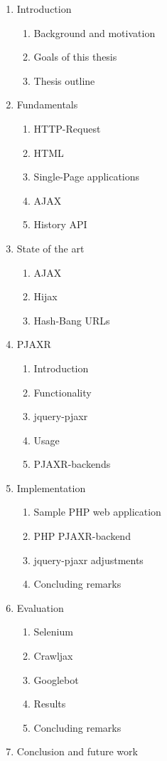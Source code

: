 \documentclass[f,bachelor,binding,twoside,palatino]{WeSTthesis}
\begin{document}
\begin{enumerate}
  \item Introduction
  \begin{enumerate}[label*=\arabic*.]
  	\item Background and motivation
  	\item Goals of this thesis
  	\item Thesis outline
  \end{enumerate}
  \item Fundamentals
  \begin{enumerate}[label*=\arabic*.]
  	\item HTTP-Request
  	\item HTML
  	\item Single-Page applications
  	\item AJAX
  	\item History API
  \end{enumerate}
  \item State of the art
  \begin{enumerate}[label*=\arabic*.]
  	\item AJAX
  	\item Hijax
  	\item Hash-Bang URLs
  \end{enumerate}
  \item PJAXR
  \begin{enumerate}[label*=\arabic*.]
  	\item Introduction
      \item Functionality
  	\item jquery-pjaxr
  	\item Usage
  	\item PJAXR-backends
  \end{enumerate}
  \item Implementation
  \begin{enumerate}[label*=\arabic*.]
  	\item Sample PHP web application
  	\item PHP PJAXR-backend
  	\item jquery-pjaxr adjustments
  	\item Concluding remarks
  \end{enumerate}
  \item Evaluation
  \begin{enumerate}[label*=\arabic*.]
  	\item Selenium
  	\item Crawljax
  	\item Googlebot
  	\item Results
  	\item Concluding remarks
  \end{enumerate}
  \item Conclusion and future work

\end{enumerate}
\end{document}
